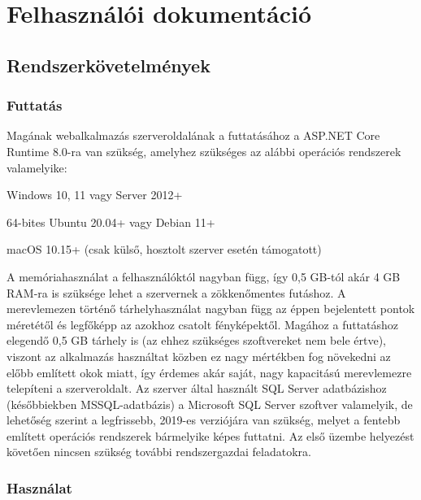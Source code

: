 \chapter{Felhasználói dokumentáció}
\label{ch:user}

\section{Rendszerkövetelmények}

\subsection{Futtatás}

Magának webalkalmazás szerveroldalának a futtatásához a ASP.NET Core Runtime 8.0-ra van szükség, amelyhez
szükséges az alábbi operációs rendszerek valamelyike:
\begin{compactitem}
	\item Windows 10, 11 vagy Server 2012+
	\item 64-bites Ubuntu 20.04+ vagy Debian 11+
	\item macOS 10.15+ (csak külső, hosztolt szerver esetén támogatott)
\end{compactitem} 
A memóriahasználat a felhasználóktól nagyban függ, így 0,5 GB-tól akár 4 GB RAM-ra is szüksége lehet a szervernek a zökkenőmentes futáshoz. A merevlemezen történő tárhelyhasználat nagyban függ az éppen bejelentett pontok méretétől és legfőképp az azokhoz csatolt fényképektől. Magához a futtatáshoz elegendő 0,5 GB tárhely is (az ehhez szükséges szoftvereket nem bele értve), viszont az alkalmazás használtat közben ez nagy mértékben fog növekedni az előbb említett okok miatt, így érdemes akár saját, nagy kapacitású merevlemezre telepíteni a szerveroldalt.
Az szerver által használt SQL Server adatbázishoz (későbbiekben MSSQL-adatbázis) a Microsoft SQL Server szoftver valamelyik, de lehetőség szerint a legfrissebb, 2019-es verziójára van szükség, melyet a fentebb említett operációs rendszerek bármelyike képes futtatni.
Az első üzembe helyezést követően nincsen szükség további rendszergazdai feladatokra.
\subsection{Használat}


